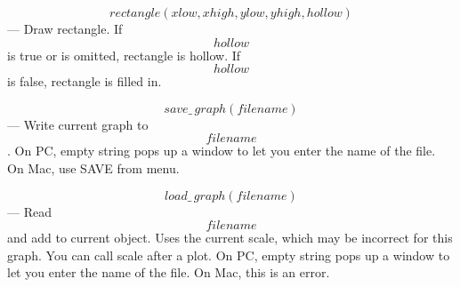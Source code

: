{\begin{enumerate}
\begin{sloppypar}
\item \[rectangle(xlow,xhigh,ylow,yhigh,hollow)\] ---
                  Draw rectangle.  If \[hollow\] is true or is omitted,
                  rectangle is hollow.  If \[hollow\] is false,
                  rectangle is filled in.
\end{sloppypar}

\item \[save\_\,graph(filename)\] ---
                  Write current graph to \[filename\].  On PC, empty
                  string pops up a window to let you enter the name of
                  the file.  On Mac, use SAVE from menu.

\item \[load\_\,graph(filename)\] ---
                  Read \[filename\] and add to current object.  Uses the
                  current scale, which may be incorrect for this
                  graph.  You can call scale after a plot.  On PC,
                  empty string pops up a window to let you enter the
                  name of the file.  On Mac, this is an error.
\end{enumerate}




\pagebreak[1]{\samepage
}}
